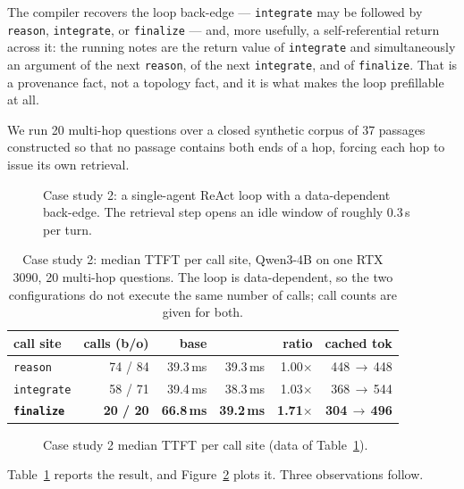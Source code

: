The compiler recovers the loop back-edge --- \texttt{integrate} may be followed
by \texttt{reason}, \texttt{integrate}, or \texttt{finalize} --- and, more
usefully, a self-referential return across it: the running notes are the return
value of \texttt{integrate} and simultaneously an argument of the next
\texttt{reason}, of the next \texttt{integrate}, and of \texttt{finalize}. That
is a provenance fact, not a topology fact, and it is what makes the loop
prefillable at all.

We run 20 multi-hop questions over a closed synthetic corpus of 37 passages
constructed so that no passage contains both ends of a hop, forcing each hop to
issue its own retrieval.

\begin{figure}[t]
\centering

\caption{Case study 2: a single-agent ReAct loop with a data-dependent back-edge.
The retrieval step opens an idle window of roughly 0.3\,s per turn.}
\label{fig:react}
\end{figure}

\begin{table}[t]
\centering
\caption{Case study 2: median TTFT per call site, Qwen3-4B on one RTX 3090, 20
multi-hop questions. The loop is data-dependent, so the two configurations do not
execute the same number of calls; call counts are given for both.}
\label{tab:react}
\footnotesize
\setlength{\tabcolsep}{3pt}
\begin{tabular}{@{}lrrrrr@{}}
\toprule
call site & calls (b/o) & base & \sysname{} & ratio & cached tok \\
\midrule
\texttt{reason}    & 74 / 84 & 39.3\,ms & 39.3\,ms & 1.00$\times$ & 448\,$\rightarrow$\,448 \\
\texttt{integrate} & 58 / 71 & 39.4\,ms & 38.3\,ms & 1.03$\times$ & 368\,$\rightarrow$\,544 \\
\textbf{\texttt{finalize}} & \textbf{20 / 20} & \textbf{66.8\,ms} & \textbf{39.2\,ms} & \textbf{1.71$\times$} & \textbf{304\,$\rightarrow$\,496} \\
\bottomrule
\end{tabular}
\end{table}

\begin{figure}[t]
\centering

\caption{Case study 2 median TTFT per call site (data of
Table~\ref{tab:react}).}
\label{fig:reactbars}
\end{figure}

Table~\ref{tab:react} reports the result, and Figure~\ref{fig:reactbars} plots
it. Three observations follow.

